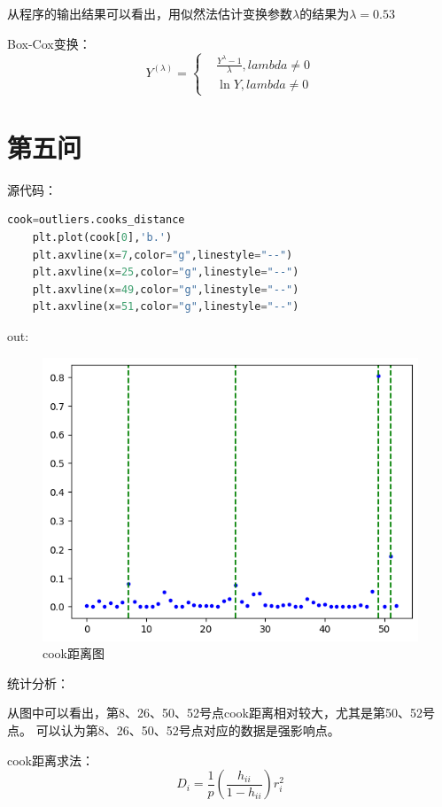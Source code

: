 \documentclass[a4paper,12pt]{article}
\begin{document}
从程序的输出结果可以看出，用似然法估计变换参数$\lambda$的结果为$\lambda=0.53$

Box-Cox变换：
\begin{equation*}
Y^{(\lambda)}=\left\{
	\begin{aligned}
		& \frac{Y^\lambda -1}{\lambda},lambda\neq 0\\
		& \ln{Y},lambda\neq 0
	\end{aligned}
\end{equation*}
\section{第五问}

源代码：
\begin{lstlisting}[language=python,breaklines]
	cook=outliers.cooks_distance
	plt.plot(cook[0],'b.')
	plt.axvline(x=7,color="g",linestyle="--")
	plt.axvline(x=25,color="g",linestyle="--")
	plt.axvline(x=49,color="g",linestyle="--")
	plt.axvline(x=51,color="g",linestyle="--")
\end{lstlisting}
out: 
\begin{figure}[htbp]
	\centering
	\includegraphics[scale=0.4]{out5.png}
	\caption{cook距离图}
\end{figure}
统计分析：

从图中可以看出，第8、26、50、52号点cook距离相对较大，尤其是第50、52号点。
可以认为第8、26、50、52号点对应的数据是强影响点。

cook距离求法：
$$D_i=\frac{1}{p}(\frac{h_{ii}}{1-h_{ii}})r_i^2$$
\end{document}
